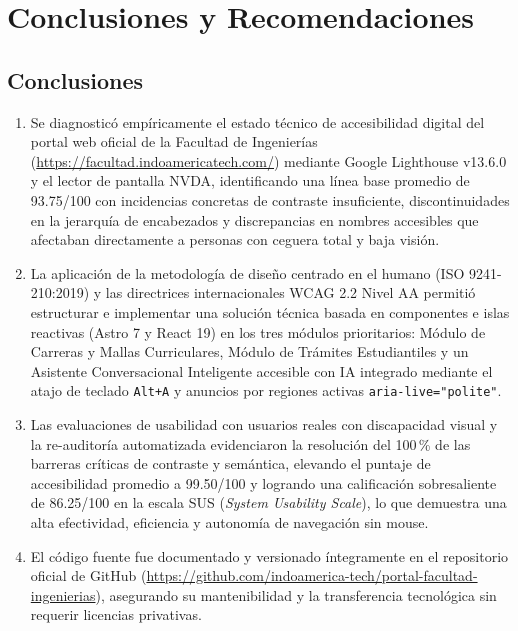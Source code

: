 \chapter{Conclusiones y Recomendaciones}
\label{chap:conclusiones}

\section{Conclusiones}
\begin{enumerate}
  \item Se diagnosticó empíricamente el estado técnico de accesibilidad digital del portal web oficial de la Facultad de Ingenierías (\url{https://facultad.indoamericatech.com/}) mediante Google Lighthouse v13.6.0 y el lector de pantalla NVDA, identificando una línea base promedio de 93.75/100 con incidencias concretas de contraste insuficiente, discontinuidades en la jerarquía de encabezados y discrepancias en nombres accesibles que afectaban directamente a personas con ceguera total y baja visión.
  \item La aplicación de la metodología de diseño centrado en el humano (ISO 9241-210:2019) y las directrices internacionales WCAG 2.2 Nivel AA permitió estructurar e implementar una solución técnica basada en componentes e islas reactivas (Astro 7 y React 19) en los tres módulos prioritarios: Módulo de Carreras y Mallas Curriculares, Módulo de Trámites Estudiantiles y un Asistente Conversacional Inteligente accesible con IA integrado mediante el atajo de teclado \texttt{Alt+A} y anuncios por regiones activas \texttt{aria-live="polite"}.
  \item Las evaluaciones de usabilidad con usuarios reales con discapacidad visual y la re-auditoría automatizada evidenciaron la resolución del 100\,\% de las barreras críticas de contraste y semántica, elevando el puntaje de accesibilidad promedio a 99.50/100 y logrando una calificación sobresaliente de 86.25/100 en la escala SUS (\textit{System Usability Scale}), lo que demuestra una alta efectividad, eficiencia y autonomía de navegación sin mouse.
  \item El código fuente fue documentado y versionado íntegramente en el repositorio oficial de GitHub (\url{https://github.com/indoamerica-tech/portal-facultad-ingenierias}), asegurando su mantenibilidad y la transferencia tecnológica sin requerir licencias privativas.
\end{enumerate}


